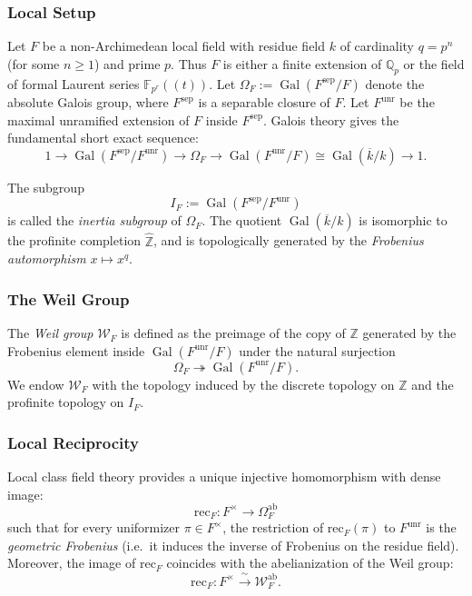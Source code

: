 \documentclass[11pt]{amsart}
\DeclareMathOperator{\Gal}{Gal}
\begin{document}
\subsubsection*{Local Setup}
Let \(F\) be a non-Archimedean local field with residue field \(k\) of cardinality 
\(q = p^n\) (for some \(n \geq 1\)) and prime \(p\). Thus \(F\) is either a finite 
extension of \(\mathbb{Q}_p\) or the field of formal Laurent series 
\(\mathbb{F}_{p^r}((t))\). Let 
\(\Omega_F := \Gal(F^{\mathrm{sep}}/F)\) denote the absolute Galois group, 
where \(F^{\mathrm{sep}}\) is a separable closure of \(F\).
Let \(F^{\mathrm{unr}}\) be the maximal unramified extension of \(F\) inside 
\(F^{\mathrm{sep}}\).
Galois theory gives the fundamental short exact sequence:
\[
1 \longrightarrow 
\Gal(F^{\mathrm{sep}} / F^{\mathrm{unr}}) 
\longrightarrow \Omega_F 
\longrightarrow \Gal(F^{\mathrm{unr}}/F) 
\cong \Gal(\overline{k}/k)
\longrightarrow 1.
\]

The subgroup
\[
I_F := \Gal(F^{\mathrm{sep}} / F^{\mathrm{unr}})
\]
is called the \emph{inertia subgroup} of \(\Omega_F\). The quotient 
\(\Gal(\overline{k}/k)\) is isomorphic to the profinite completion 
\(\widehat{\mathbb{Z}}\), and is topologically generated by the 
\emph{Frobenius automorphism} \(x \mapsto x^q\). 

\subsubsection*{The Weil Group}

The \emph{Weil group} \(\mathcal{W}_F\) is defined as the preimage of the copy 
of \(\mathbb{Z}\) generated by the Frobenius element inside 
\(\Gal(F^{\mathrm{unr}}/F)\) under the natural surjection
\[
\Omega_F \twoheadrightarrow \Gal(F^{\mathrm{unr}}/F).
\]
We endow \(\mathcal{W}_F\) with the topology induced by the discrete topology 
on \(\mathbb{Z}\) and the profinite topology on \(I_F\).

\subsubsection*{Local Reciprocity}

Local class field theory provides a unique injective homomorphism with dense image:
\begin{equation} \label{eq:local-reciprocity}
\mathrm{rec}_F : F^\times \longrightarrow \Omega_F^{\mathrm{ab}}
\end{equation}
such that for every uniformizer \(\pi \in F^\times\), 
the restriction of \(\mathrm{rec}_F(\pi)\) to \(F^{\mathrm{unr}}\) is the 
\emph{geometric Frobenius} (i.e.~it induces the inverse of Frobenius on the residue field).
Moreover, the image of \(\mathrm{rec}_F\) coincides with the abelianization of 
the Weil group:
\[
\mathrm{rec}_F : F^\times \xrightarrow{\ \sim \ } \mathcal{W}_F^{\mathrm{ab}}.
\]
\end{document}
